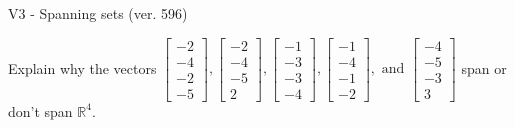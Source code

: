 \begin{exercise}
  \begin{exerciseTitle}V3 - Spanning sets (ver. 596)\end{exerciseTitle}
  \begin{exerciseStatement}
    Explain why the vectors \(\left[\begin{array}{r}
-2 \\
-4 \\
-2 \\
-5
\end{array}\right] , \left[\begin{array}{r}
-2 \\
-4 \\
-5 \\
2
\end{array}\right] , \left[\begin{array}{r}
-1 \\
-3 \\
-3 \\
-4
\end{array}\right] , \left[\begin{array}{r}
-1 \\
-4 \\
-1 \\
-2
\end{array}\right] , \text{ and } \left[\begin{array}{r}
-4 \\
-5 \\
-3 \\
3
\end{array}\right]\) span or don't span \(\mathbb{R}^4\). 
	



\end{exerciseStatement}
\end{exercise}
